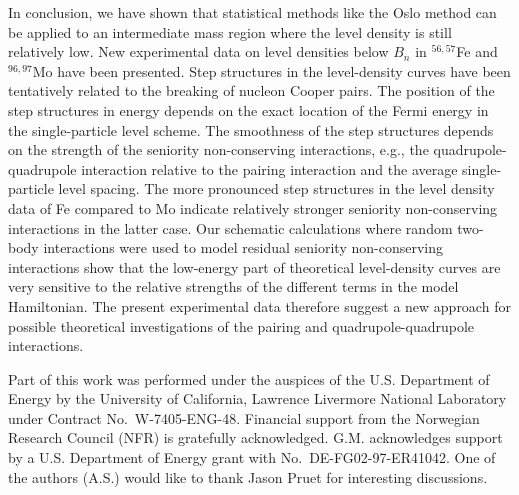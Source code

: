 \begin{multicols}{2}
In conclusion, we have shown that statistical methods like the Oslo method can
be applied to an intermediate mass region where the level density is still 
relatively low. New experimental data on level densities below $B_n$ in 
$^{56,57}$Fe and $^{96,97}$Mo have been presented. Step structures in the 
level-density curves have been tentatively related to the breaking of nucleon 
Cooper pairs. The position of the step structures in energy depends on the 
exact location of the Fermi energy in the single-particle level scheme. The 
smoothness of the step structures depends on the strength of the seniority 
non-conserving interactions, e.g., the quadrupole-quadrupole interaction 
relative to the pairing interaction and the average single-particle level 
spacing. The more pronounced step structures in the level density data of Fe 
compared to Mo indicate relatively stronger seniority non-conserving 
interactions in the latter case. Our schematic calculations where random 
two-body interactions were used to model residual seniority non-conserving 
interactions show that the low-energy part of theoretical level-density curves 
are very sensitive to the relative strengths of the different terms in the 
model Hamiltonian. The present experimental data therefore suggest a new 
approach for possible theoretical investigations of the pairing and 
quadrupole-quadrupole interactions.

Part of this work was performed under the auspices of the U.S. Department of 
Energy by the University of California, Lawrence Livermore National Laboratory 
under Contract No.\ W-7405-ENG-48. Financial support from the Norwegian 
Research Council (NFR) is gratefully acknowledged. G.M. acknowledges support by
a U.S. Department of Energy grant with No.\ DE-FG02-97-ER41042. One of the 
authors (A.S.) would like to thank Jason Pruet for interesting discussions.


\end{multicols}
